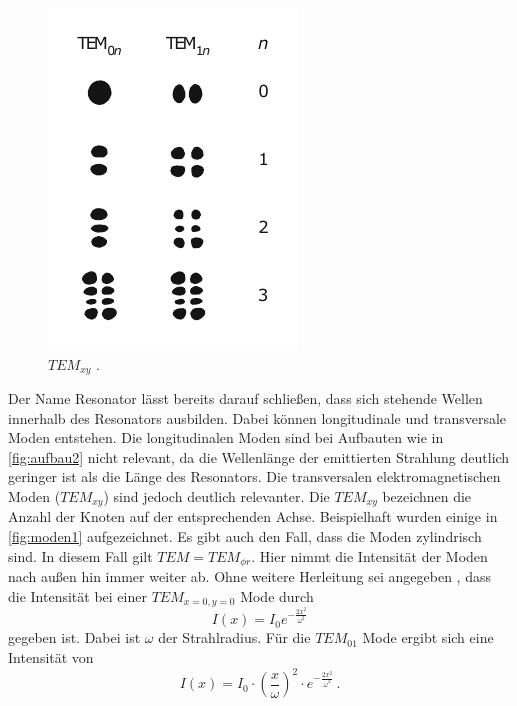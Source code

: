 \begin{figure}
    \includegraphics[width=\linewidth]{pictures/moden1.pdf}
    \caption{$TEM_{xy}$ \cite{HeNe_levels}.}
    \label{fig:moden1}
\end{figure}
Der Name Resonator lässt bereits darauf schließen, dass sich stehende Wellen innerhalb des Resonators ausbilden.
Dabei können longitudinale und transversale Moden entstehen.
Die longitudinalen Moden sind bei Aufbauten wie in \autoref{fig:aufbau2} nicht relevant, da die Wellenlänge der emittierten Strahlung deutlich geringer ist als die Länge des Resonators.
Die transversalen elektromagnetischen Moden ($TEM_{xy}$) sind jedoch deutlich relevanter.
Die $TEM_{xy}$ bezeichnen die Anzahl der Knoten auf der entsprechenden Achse.
Beispielhaft wurden einige in \autoref{fig:moden1} aufgezeichnet.
Es gibt auch den Fall, dass die Moden zylindrisch sind.
In diesem Fall gilt $TEM = TEM_{\phi r}$.
Hier nimmt die Intensität der Moden nach außen hin immer weiter ab.
Ohne weitere Herleitung sei angegeben \cite{demtroeder_laser}, dass die Intensität bei einer $TEM_{x=0,y=0}$ Mode durch
\begin{equation} \label{eq:tem00}
    I (x) =I_0 e^{- \frac{2 x^2}{\omega^2}}
\end{equation}
gegeben ist. Dabei ist $\omega$ der Strahlradius.
Für die $TEM_{01}$ Mode ergibt sich eine Intensität von
\begin{equation} \label{eq:tem01}
    I (x) = I_0 \cdot \left( \frac{x}{\omega} \right)^2 \cdot e^{- \frac{2 x^2}{\omega^2}} \, .
\end{equation}

